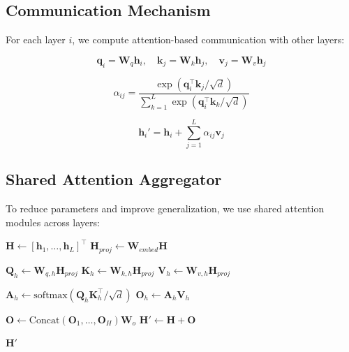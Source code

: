 \documentclass[11pt]{article}
\begin{document}
\subsection{Communication Mechanism}

For each layer $i$, we compute attention-based communication with other layers:

\begin{equation}
\mathbf{q}_i = \mathbf{W}_q \mathbf{h}_i, \quad
\mathbf{k}_j = \mathbf{W}_k \mathbf{h}_j, \quad
\mathbf{v}_j = \mathbf{W}_v \mathbf{h}_j
\end{equation}

\begin{equation}
\alpha_{ij} = \frac{\exp(\mathbf{q}_i^\top \mathbf{k}_j / \sqrt{d})}{\sum_{k=1}^L \exp(\mathbf{q}_i^\top \mathbf{k}_k / \sqrt{d})}
\end{equation}

\begin{equation}
\mathbf{h}_i' = \mathbf{h}_i + \sum_{j=1}^L \alpha_{ij} \mathbf{v}_j
\end{equation}

\subsection{Shared Attention Aggregator}

To reduce parameters and improve generalization, we use shared attention modules across layers:

\begin{algorithm}[H]
\caption{Shared Attention Aggregation}
\begin{algorithmic}[1]
    \State $\mathbf{H} \gets [\mathbf{h}_1, \dots, \mathbf{h}_L]^\top$ 
    \State $\mathbf{H}_{proj} \gets \mathbf{W}_{embed} \mathbf{H}$ 

        \State $\mathbf{Q}_h \gets \mathbf{W}_{q,h} \mathbf{H}_{proj}$
        \State $\mathbf{K}_h \gets \mathbf{W}_{k,h} \mathbf{H}_{proj}$
        \State $\mathbf{V}_h \gets \mathbf{W}_{v,h} \mathbf{H}_{proj}$

        \State $\mathbf{A}_h \gets \text{softmax}(\mathbf{Q}_h \mathbf{K}_h^\top / \sqrt{d})$
        \State $\mathbf{O}_h \gets \mathbf{A}_h \mathbf{V}_h$
    \EndFor

    \State $\mathbf{O} \gets \text{Concat}(\mathbf{O}_1, \dots, \mathbf{O}_H) \mathbf{W}_o$
    \State $\mathbf{H}' \gets \mathbf{H} + \mathbf{O}$ 

    \State \Return $\mathbf{H}'$
\EndProcedure
\end{algorithmic}
\end{algorithm}
\end{document}
